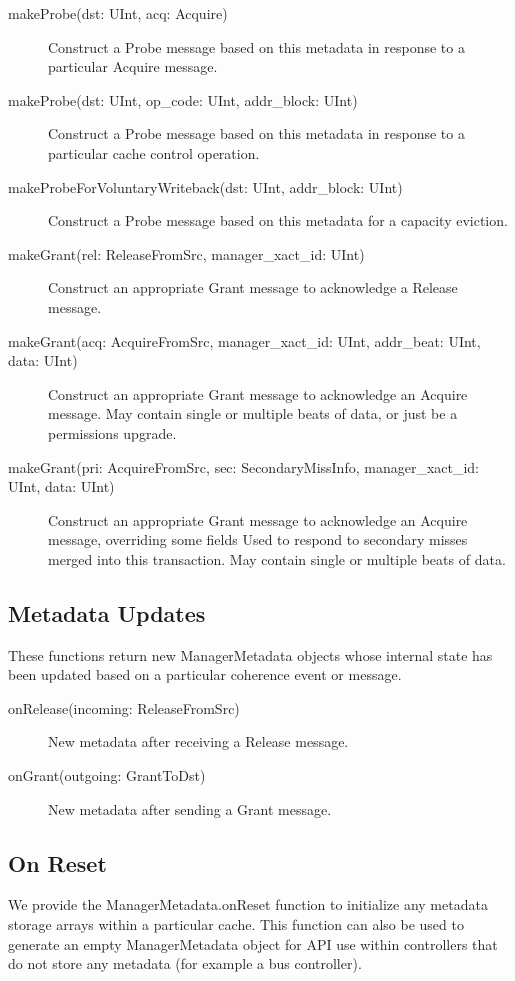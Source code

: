 \begin{description}
\item[makeProbe(dst: UInt, acq: Acquire) ]
Construct a Probe message based on this metadata in response to a particular Acquire message.
\item[makeProbe(dst: UInt, op\_code: UInt, addr\_block: UInt) ]
Construct a Probe message  based on this metadata in response to a particular cache control operation.
\item[makeProbeForVoluntaryWriteback(dst: UInt, addr\_block: UInt) ]
Construct a Probe message based on this metadata for a capacity eviction.
\item[makeGrant(rel: ReleaseFromSrc, manager\_xact\_id: UInt) ]
Construct an appropriate Grant message to acknowledge a Release message.
\item[makeGrant(acq: AcquireFromSrc, manager\_xact\_id: UInt, addr\_beat: UInt, data: UInt) ]
Construct an appropriate Grant message to acknowledge an Acquire message.
May contain single or multiple beats of data, or just be a permissions upgrade.
\item[makeGrant(pri: AcquireFromSrc, sec: SecondaryMissInfo, manager\_xact\_id: UInt, data: UInt) ]
Construct an appropriate Grant message to acknowledge an Acquire message, overriding some fields
Used to respond to secondary misses merged into this transaction.
May contain single or multiple beats of data.
\end{description}

\subsection{Metadata Updates}

These functions return new ManagerMetadata objects whose internal state has been updated based on a particular coherence event or message.

\begin{description}
\item[onRelease(incoming: ReleaseFromSrc) ]
New metadata after receiving a Release message.
\item[onGrant(outgoing: GrantToDst) ]
New metadata after sending a Grant message.
\end{description}

\subsection{On Reset}

We provide the ManagerMetadata.onReset function to initialize
any metadata storage arrays within a particular cache.
This function can also be used to generate an empty ManagerMetadata object for API 
use within controllers that do not store any metadata (for example a bus controller).

